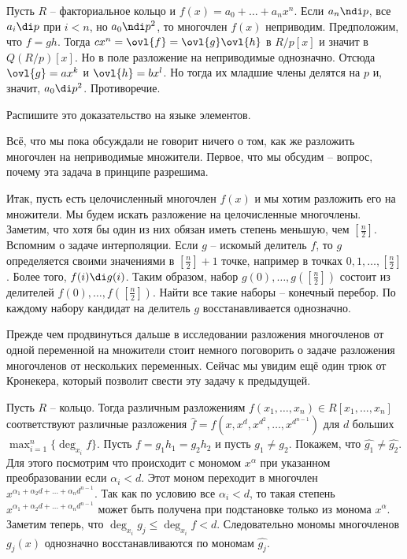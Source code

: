  Пусть $R$ -- факториальное кольцо и $f(x)= a_0 + \dots + a_n x^n$. Если $a_n \ndi p$, все $a_i \di p$ при $i<n$, но $a_0\ndi p^2$, то многочлен $f(x)$ неприводим.
\proof
Предположим, что $f=gh$. Тогда $c x^n=\ovl{f}=\ovl{g}\ovl{h}$ в $R/p[x]$ и значит в $Q(R/p)[x]$. Но в поле разложение на неприводимые однозначно. Отсюда $\ovl{g}=ax^k$ и $\ovl{h}=b x^l$. Но тогда их младшие члены делятся на $p$ и, значит, $a_0\di p^2$. Противоречие. 
\endproof
\ethrm 

\upr Распишите это доказательство на языке элементов.
\eupr

Всё, что мы пока обсуждали не говорит ничего о том, как же разложить многочлен на неприводимые множители. Первое, что мы обсудим -- вопрос, почему эта задача в принципе разрешима.

Итак, пусть есть целочисленный многочлен $f(x)$ и мы хотим разложить его на множители. Мы будем искать разложение на целочисленные многочлены. Заметим, что хотя бы один из них обязан иметь степень меньшую, чем $[\frac{n}{2}]$. Вспомним о задаче интерполяции. Если $g$ -- искомый делитель $f$, то $g$ определяется своими значениями в $[\frac{n}{2}]+1$ точке, например в точках $0,1,\dots, [\frac{n}{2}]$. Более того, $f(i) \di g(i)$. Таким образом, набор $g(0),\dots, g([\frac{n}{2}])$ состоит из делителей $f(0),\dots,f([\frac{n}{2}])$. Найти все такие наборы -- конечный перебор. По каждому набору кандидат на делитель $g$ восстанавливается однозначно.

Прежде чем продвинуться дальше в исследовании разложения многочленов от одной переменной на множители стоит немного поговорить о задаче разложения многочленов от нескольких переменных. Сейчас мы увидим ещё один трюк от Кронекера, который позволит свести эту задачу к предыдущей.

\thrm[Трюк] Пусть $R$ -- кольцо. Тогда различным разложениям $f(x_1,\dots,x_n)\in R[x_1,\dots,x_n]$   соответствуют различные разложения $\hat{f}=f(x, x^d, x^{d^2}, \dots, x^{d^{n-1}})$ для $d$ больших $\max_{i=1}^n \{\deg_{x_i} f\}$.
\proof Пусть $f=g_1h_1=g_2h_2$ и пусть $g_1\neq g_2$. Покажем, что $\hat{g_1}\neq \hat{g_2}$. Для этого посмотрим что происходит с мономом $x^{\alpha}$ при указанном преобразовании если $\alpha_i < d$. Этот моном переходит в многочлен $x^{\alpha_1+\alpha_2d+\dots+\alpha_n d^{n-1}}$. Так как по условию все $\alpha_i<d$, то такая степень  $x^{\alpha_1+\alpha_2d+\dots+\alpha_n d^{n-1}}$ может быть получена при подстановке только из монома $x^{\alpha}$. Заметим теперь, что $\deg_{x_i} g_j \leq \deg_{x_i} f <d$. Следовательно мономы многочленов $g_j(x)$ однозначно восстанавливаются по мономам $\hat{g_j}$.
\endproof
\ethrm

